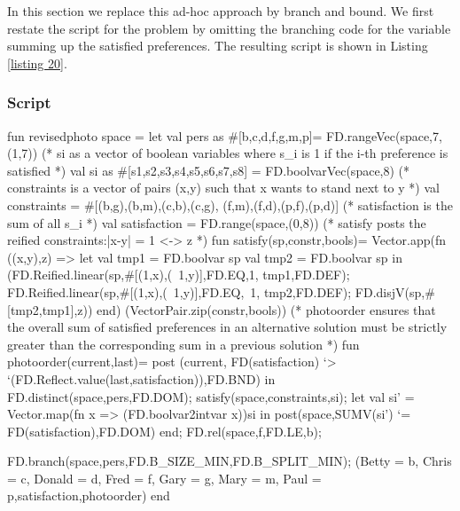 \documentclass[a4paper,halfparskip]{scrartcl}
\begin{document}
In this section we replace this ad-hoc approach by branch and bound. 
We first restate the script for the problem by omitting the branching 
code for the variable summing up the satisfied preferences. The resulting 
script is shown in Listing \ref{listing 20}.

\subsubsection{Script}
\begin{myverbatim}
fun revisedphoto space =
    let 
        val pers as #[b,c,d,f,g,m,p]= 
                      FD.rangeVec(space,7,(1,7))
       (* si as a vector of boolean variables where s_i is 1 
          if the i-th preference is satisfied *)
        val si as #[s1,s2,s3,s4,s5,s6,s7,s8] = 
                           FD.boolvarVec(space,8)
       (* constraints is a vector of pairs (x,y) such that x wants to
          stand next to y *)
        val constraints = #[(b,g),(b,m),(c,b),(c,g),
                            (f,m),(f,d),(p,f),(p,d)]
       (* satisfaction is the sum of all s_i *)
        val satisfaction = FD.range(space,(0,8))
       (* satisfy posts the reified constraints:|x-y| = 1 <-> z *)
        fun satisfy(sp,constr,bools)= 
            Vector.app(fn ((x,y),z) => 
              let
                 val tmp1 = FD.boolvar sp
                 val tmp2 = FD.boolvar sp
              in
                (FD.Reified.linear(sp,#[(1,x),(~1,y)],FD.EQ,1,
                                      tmp1,FD.DEF);
                 FD.Reified.linear(sp,#[(1,x),(~1,y)],FD.EQ,~1,
                                      tmp2,FD.DEF);
                 FD.disjV(sp,#[tmp2,tmp1],z))
              end)
                 (VectorPair.zip(constr,bools))
       (* photoorder ensures that the overall sum of satisfied
          preferences in an alternative solution must be strictly 
          greater than the corresponding sum in a previous solution *)
        fun photoorder(current,last)=
            post (current, FD(satisfaction) `> 
                  `(FD.Reflect.value(last,satisfaction)),FD.BND)                   
    in
        FD.distinct(space,pers,FD.DOM);
        satisfy(space,constraints,si);
        let 
           val si' = Vector.map(fn x => (FD.boolvar2intvar x))si
        in
           post(space,SUMV(si') `= FD(satisfaction),FD.DOM)
        end;
        FD.rel(space,f,FD.LE,b);
           
        FD.branch(space,pers,FD.B_SIZE_MIN,FD.B_SPLIT_MIN);
      ({Betty = b, Chris = c, Donald = d, Fred = f,
       Gary = g, Mary = m, Paul = p,satisfaction},photoorder)
   end
\end{myverbatim}
\end{document}
